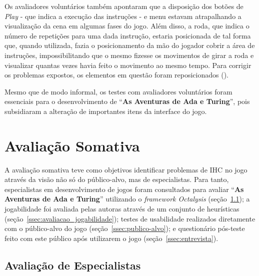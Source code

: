 

Os avaliadores voluntários também apontaram que a disposição dos botões de \textit{Play} - que indica a execução das instruções - e menu estavam atrapalhando a visualização da cena em algumas fases do jogo. Além disso, a roda, que indica o número de repetições para uma dada instrução, estaria posicionada de tal forma que, quando utilizada, fazia o posicionamento da mão do jogador cobrir a área de instruções, impossibilitando que o mesmo fizesse os movimentos de girar a roda e visualizar quantas vezes havia feito o movimento ao mesmo tempo. Para corrigir os problemas expostos, os elementos em questão foram reposicionados ().


Mesmo que de modo informal, os testes com avaliadores voluntários foram essenciais para o desenvolvimento de “\textbf{As Aventuras de Ada e Turing}”, pois subsidiaram a alteração de importantes itens da interface do jogo.

\section{Avaliação Somativa} \label{sec:somativa}

A avaliação somativa teve como objetivos identificar problemas de \acrshort{IHC} no jogo através da visão não só do público-alvo, mas de especialistas. Para tanto, especialistas em desenvolvimento de jogos foram consultados para avaliar “\textbf{As Aventuras de Ada e Turing}” utilizando o \textit{framework Octalysis} (seção~\ref{ssec:especialistas}); a jogabilidade foi avaliada pelas autoras através de um conjunto de heurísticas (seção~\ref{ssec:avaliacao_jogabilidade}); testes de usabilidade realizados diretamente com o público-alvo do jogo (seção~\ref{ssec:publico-alvo}); e questionário pós-teste feito com este público após utilizarem o jogo (seção~\ref{ssec:entrevista}).
\subsection{Avaliação de Especialistas} \label{ssec:especialistas}

